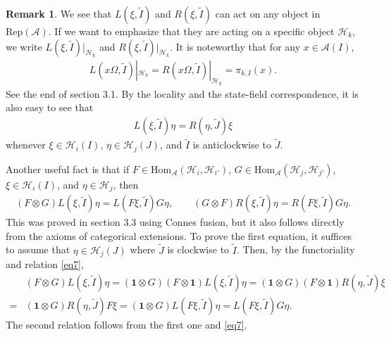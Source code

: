 \documentclass[12pt,a4paper]{article}
\theoremstyle{definition}
\newtheorem{rem}[df]{Remark}
\theoremstyle{plain}
\newcommand{\mc}{\mathcal}
\newcommand{\wtd}{\widetilde}
\newcommand{\id}{\mathbf{1}}
\newcommand{\Hom}{\mathrm{Hom}}
\newcommand{\RepA}{\mathrm{Rep}(\mc A)}
\numberwithin{equation}{section}
\begin{document}
\begin{rem}
We see that $L(\xi,\wtd I)$ and $R(\xi,\wtd I)$  can act on any object in $\RepA$. If we want to emphasize that they are acting on a specific object $\mc H_k$, we write $L(\xi,\wtd I)|_{\mc H_k}$ and $R(\xi,\wtd I)|_{\mc H_k}$. It is noteworthy that for any $x\in\mc A(I)$,
\begin{align}
L(x\Omega,\wtd I)|_{\mc H_k}= R(x\Omega,\wtd I)|_{\mc H_k}=\pi_{k,I}(x).\label{eq9}
\end{align}
See the end of \cite{Gui21a} section 3.1. By the locality and the state-field correspondence, it is also easy to see that
\begin{align}
L(\xi,\wtd I)\eta=R(\eta,\wtd J)\xi\label{eq7}
\end{align}
whenever $\xi\in\mc H_i(I)$, $\eta\in\mc H_j(J)$, and $\wtd I$ is anticlockwise to $\wtd J$.
\end{rem}



Another useful fact is that if $F\in\Hom_{\mc A}(\mc H_i,\mc H_{i'})$, $G\in\Hom_{\mc A}(\mc H_j,\mc H_{j'})$,  $\xi\in\mc H_i(I)$, and $\eta\in\mc H_j$, then
\begin{align}
(F\otimes G)L(\xi,\wtd I)\eta=L(F\xi,\wtd I)G\eta,\qquad (G\otimes F)R(\xi,\wtd I)\eta=R(F\xi,\wtd I)G\eta.\label{eq8}
\end{align}
This was proved in \cite{Gui21a} section 3.3 using Connes fusion, but it also follows directly from the axioms of categorical extensions. To prove the first equation, it suffices to assume that $\eta\in\mc H_j(J)$ where $\wtd J$ is clockwise to $\wtd I$. Then, by the functoriality and relation \eqref{eq7},
\begin{align*}
&(F\otimes G)L(\xi,\wtd I)\eta=(\id\otimes G)(F\otimes \id)L(\xi,\wtd I)\eta=(\id\otimes G)(F\otimes \id)R(\eta,\wtd J)\xi\\
=&(\id\otimes G)R(\eta,\wtd J)F\xi=(\id\otimes G)L(F\xi,\wtd I)\eta=L(F\xi,\wtd I)G\eta.
\end{align*}
The second relation follows from the first one and \eqref{eq7}.
\end{document}
